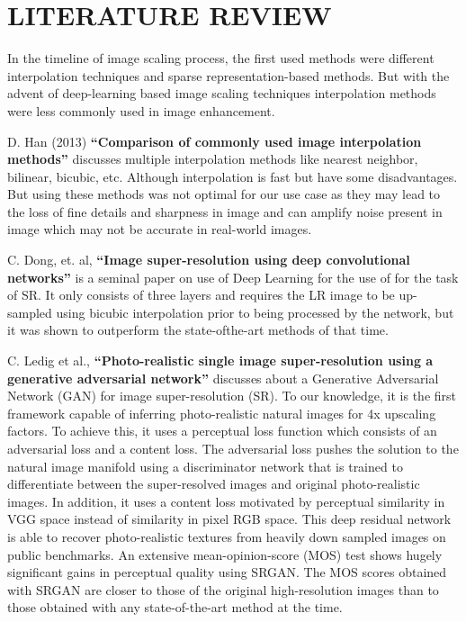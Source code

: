 \newpage
\section{LITERATURE REVIEW}
In the timeline of image scaling process, the first used methods were different interpolation techniques and sparse representation-based methods. But with the advent
of deep-learning based image scaling techniques interpolation methods were less commonly used in image enhancement.

D. Han (2013) {\bf“Comparison of commonly used image interpolation methods”} discusses multiple interpolation methods like nearest neighbor, bilinear, bicubic, etc. Although interpolation is fast but have some disadvantages. But using these methods was not optimal for our use case as they may lead to the loss of fine details and sharpness in image and can amplify noise present in image which may not be accurate in real-world images.\cite{r1}

C. Dong, et. al, {\bf“Image super-resolution using deep convolutional networks”} is a seminal paper on use of Deep Learning for the use of for the task of SR. It only consists of three layers and requires the LR image to be up-sampled using bicubic interpolation prior to being processed by the network, but it was shown to outperform the state-ofthe-art methods of that time.\cite{r2}

C. Ledig et al., {\bf“Photo-realistic single image super-resolution using a generative adversarial network”} discusses about a Generative Adversarial Network (GAN) for image super-resolution (SR). To our knowledge, it is the first framework capable of inferring photo-realistic natural images for 4x upscaling factors. To achieve this, it uses
a perceptual loss function which consists of an adversarial loss and a content loss. The adversarial loss pushes the solution to the natural image manifold using a discriminator
network that is trained to differentiate between the super-resolved images and original photo-realistic images. In addition, it uses a content loss motivated by perceptual
similarity in VGG space instead of similarity in pixel RGB space. This deep residual network is able to recover photo-realistic textures from heavily down sampled images on public
benchmarks. An extensive mean-opinion-score (MOS) test shows hugely significant gains in perceptual quality using SRGAN. The MOS scores obtained with SRGAN are
closer to those of the original high-resolution images than to those obtained with any state-of-the-art method at the time.\cite{r3}
